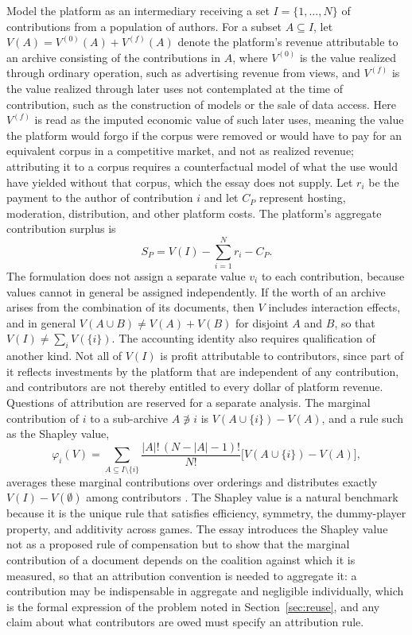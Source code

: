 \documentclass[11pt]{article}
\theoremstyle{remark}
\begin{document}
Model the platform as an intermediary receiving a set $I=\{1,\dots,N\}$ of contributions from a population of authors. For a subset $A\subseteq I$, let $V(A)=V^{(0)}(A)+V^{(f)}(A)$ denote the platform's revenue attributable to an archive consisting of the contributions in $A$, where $V^{(0)}$ is the value realized through ordinary operation, such as advertising revenue from views, and $V^{(f)}$ is the value realized through later uses not contemplated at the time of contribution, such as the construction of models or the sale of data access. Here $V^{(f)}$ is read as the imputed economic value of such later uses, meaning the value the platform would forgo if the corpus were removed or would have to pay for an equivalent corpus in a competitive market, and not as realized revenue; attributing it to a corpus requires a counterfactual model of what the use would have yielded without that corpus, which the essay does not supply. Let $r_i$ be the payment to the author of contribution $i$ and let $C_P$ represent hosting, moderation, distribution, and other platform costs. The platform's aggregate contribution surplus is
\begin{equation}
S_P = V(I) - \sum_{i=1}^{N} r_i - C_P .
\end{equation}
The formulation does not assign a separate value $v_i$ to each contribution, because values cannot in general be assigned independently. If the worth of an archive arises from the combination of its documents, then $V$ includes interaction effects, and in general $V(A\cup B)\ne V(A)+V(B)$ for disjoint $A$ and $B$, so that $V(I)\ne\sum_i V(\{i\})$. The accounting identity also requires qualification of another kind. Not all of $V(I)$ is profit attributable to contributors, since part of it reflects investments by the platform that are independent of any contribution, and contributors are not thereby entitled to every dollar of platform revenue. Questions of attribution are reserved for a separate analysis. The marginal contribution of $i$ to a sub-archive $A\not\ni i$ is $V(A\cup\{i\})-V(A)$, and a rule such as the Shapley value,
\begin{equation}
\varphi_i(V)=\sum_{A\subseteq I\setminus\{i\}}\frac{|A|!\,(N-|A|-1)!}{N!}\bigl[V(A\cup\{i\})-V(A)\bigr],
\end{equation}
averages these marginal contributions over orderings and distributes exactly $V(I)-V(\emptyset)$ among contributors \cite{shapley1953}. The Shapley value is a natural benchmark because it is the unique rule that satisfies efficiency, symmetry, the dummy-player property, and additivity across games. The essay introduces the Shapley value not as a proposed rule of compensation but to show that the marginal contribution of a document depends on the coalition against which it is measured, so that an attribution convention is needed to aggregate it: a contribution may be indispensable in aggregate and negligible individually, which is the formal expression of the problem noted in Section~\ref{sec:reuse}, and any claim about what contributors are owed must specify an attribution rule.
\end{document}
